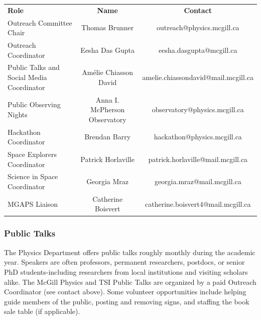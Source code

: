 \vspace{-5 pt}
 \begin{table}[h!]
        \hspace*{-2.7cm}
    \centering
    \renewcommand{\arraystretch}{1.2}
    \begin{tabular}{|>{\columncolor{ocre!20}}lc>{\columncolor{ocre!20}}c|}
    \hline
    \rowcolor{ocre!60}
  {\color{white}\large\sffamily \textbf{Role}} & {\color{white}\large\sffamily \textbf{Name}}   & {\color{white}\large\sffamily \textbf{Contact}} \\

        Outreach Committee Chair & Thomas Brunner & outreach@physics.mcgill.ca \\
        Outreach Coordinator & Eesha Das Gupta & eesha.dasgupta@mcgill.ca\\
        Public Talks and Social Media Coordinator & Amélie Chiasson David & amelie.chiassondavid@mail.mcgill.ca\\
        Public Observing Nights & Anna I. McPherson Observatory & observatory@physics.mcgill.ca  \\
        Hackathon Coordinator &  Brendan Barry & hackathon@physics.mcgill.ca \\
        Space Explorers Coordinator & Patrick Horlaville & patrick.horlaville@mail.mcgill.ca \\
        Science in Space Coordinator & Georgia Mraz & georgia.mraz@mail.mcgill.ca \\
        MGAPS Liaison & Catherine Boisvert & catherine.boisvert4@mail.mcgill.ca\\
        \hline
\end{tabular}
\end{table}

\newpage
\subsubsection{Public Talks} 
The Physics Department offers public talks roughly monthly during the academic year. Speakers are often professors, permanent researchers, postdocs, or senior PhD students-including researchers from local institutions and visiting scholars alike. The McGill Physics and TSI Public Talks are organized by a paid Outreach Coordinator (see contact above). Some volunteer opportunities include helping guide members of the public, posting and removing signs, and staffing the book sale table (if applicable). 

